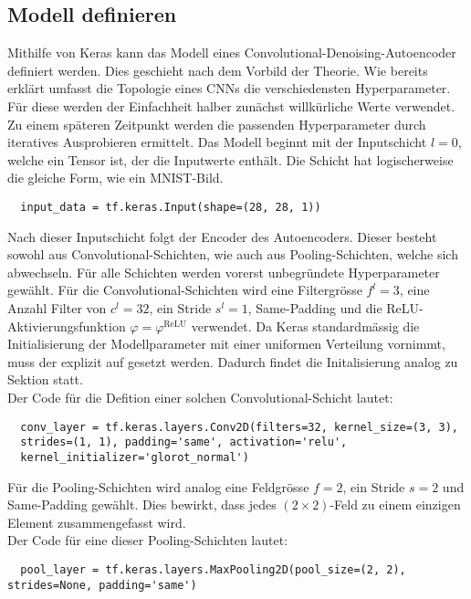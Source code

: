 \subsection{Modell definieren}
Mithilfe von Keras kann das Modell eines Convolutional-Denoising-Autoencoder
definiert werden. Dies geschieht nach dem Vorbild der Theorie.
Wie bereits erklärt umfasst die Topologie eines CNNs die verschiedensten Hyperparameter.
Für diese werden der Einfachheit halber zunächst willkürliche Werte verwendet.
Zu einem späteren Zeitpunkt werden die passenden Hyperparameter durch iteratives Ausprobieren ermittelt.
\para{}
Das Modell beginnt mit der Inputschicht $l=0$, welche ein Tensor ist, der
die Inputwerte enthält. Die Schicht hat logischerweise die gleiche Form, wie ein MNIST-Bild.
\begin{verbatim}
  input_data = tf.keras.Input(shape=(28, 28, 1))
\end{verbatim}
\para{}
Nach dieser Inputschicht folgt der Encoder des Autoencoders. Dieser besteht
sowohl aus Convolutional-Schichten, wie auch aus Pooling-Schichten, welche sich abwechseln.
Für alle Schichten werden vorerst unbegründete Hyperparameter gewählt.
Für die Convolutional-Schichten wird
eine Filtergrösse $f^l = 3$, eine Anzahl Filter von $c^l = 32$,
ein Stride $s^l=1$, Same-Padding und die ReLU-Aktivierungsfunktion $\varphi =
\varphi^{\text{ReLU}}$ verwendet.
Da Keras standardmässig die Initialisierung der Modellparameter mit einer
uniformen Verteilung vornimmt, muss der  explizit auf
 gesetzt werden. Dadurch findet die Initalisierung analog
zu Sektion  statt. \\
Der Code für die Defition einer solchen Convolutional-Schicht lautet:
\begin{verbatim}
  conv_layer = tf.keras.layers.Conv2D(filters=32, kernel_size=(3, 3),
  strides=(1, 1), padding='same', activation='relu',
  kernel_initializer='glorot_normal')
\end{verbatim}
Für die Pooling-Schichten wird analog eine Feldgrösse $f = 2$, ein
Stride $s = 2$ und Same-Padding gewählt. Dies bewirkt, dass jedes $(2
\times 2)$-Feld zu einem einzigen Element zusammengefasst wird. \\
Der Code für eine dieser Pooling-Schichten lautet:
\begin{verbatim}
  pool_layer = tf.keras.layers.MaxPooling2D(pool_size=(2, 2), strides=None, padding='same')
\end{verbatim}
